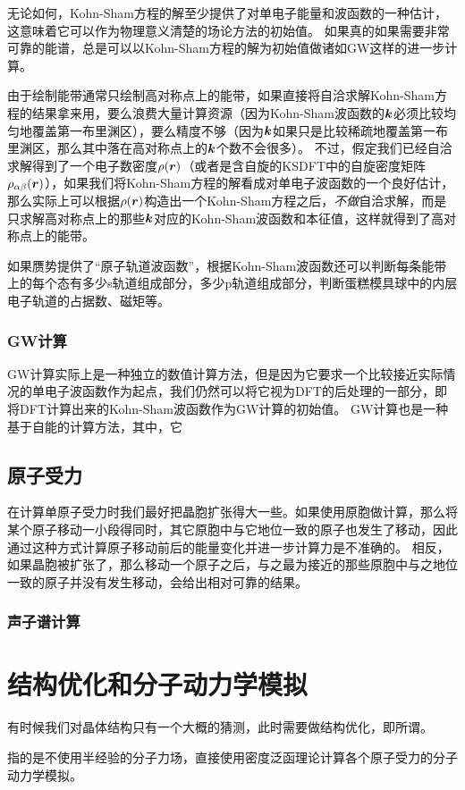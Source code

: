无论如何，Kohn-Sham方程的解至少提供了对单电子能量和波函数的一种估计，这意味着它可以作为物理意义清楚的场论方法的初始值。
如果真的如果需要非常可靠的能谱，总是可以以Kohn-Sham方程的解为初始值做诸如GW这样的进一步计算。

由于绘制能带通常只绘制高对称点上的能带，如果直接将自洽求解Kohn-Sham方程的结果拿来用，要么浪费大量计算资源（因为Kohn-Sham波函数的$\vb*{k}$必须比较均匀地覆盖第一布里渊区），要么精度不够（因为$\vb*{k}$如果只是比较稀疏地覆盖第一布里渊区，那么其中落在高对称点上的$\vb*{k}$个数不会很多）。
不过，假定我们已经自洽求解得到了一个电子数密度$\rho(\vb*{r})$（或者是含自旋的KSDFT中的自旋密度矩阵$\rho_{\alpha \beta}(\vb*{r})$），如果我们将Kohn-Sham方程的解看成对单电子波函数的一个良好估计，那么实际上可以根据$\rho(\vb*{r})$构造出一个Kohn-Sham方程之后，\emph{不做}自洽求解，而是只求解高对称点上的那些$\vb*{k}$对应的Kohn-Sham波函数和本征值，这样就得到了高对称点上的能带。

如果赝势提供了“原子轨道波函数”，根据Kohn-Sham波函数还可以判断每条能带上的每个态有多少s轨道组成部分，多少p轨道组成部分，判断蛋糕模具球中的内层电子轨道的占据数、磁矩等。

\subsubsection{GW计算}

GW计算实际上是一种独立的数值计算方法，但是因为它要求一个比较接近实际情况的单电子波函数作为起点，我们仍然可以将它视为DFT的后处理的一部分，即将DFT计算出来的Kohn-Sham波函数作为GW计算的初始值。
GW计算也是一种基于自能的计算方法，其中，它

\subsection{原子受力}

在计算单原子受力时我们最好把晶胞扩张得大一些。如果使用原胞做计算，那么将某个原子移动一小段得同时，其它原胞中与它地位一致的原子也发生了移动，因此通过这种方式计算原子移动前后的能量变化并进一步计算力是不准确的。
相反，如果晶胞被扩张了，那么移动一个原子之后，与之最为接近的那些原胞中与之地位一致的原子并没有发生移动，会给出相对可靠的结果。

\subsubsection{声子谱计算}

\section{结构优化和分子动力学模拟}\label{sec:structural-relaxation-md}

有时候我们对晶体结构只有一个大概的猜测，此时需要做结构优化，即所谓。

指的是不使用半经验的分子力场，直接使用密度泛函理论计算各个原子受力的分子动力学模拟。
